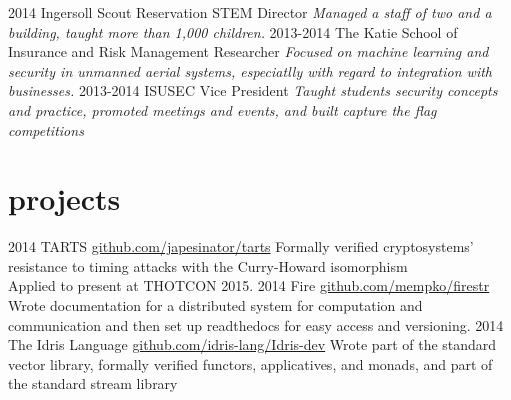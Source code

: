 \documentclass[]{friggeri-cv}
\begin{document}
\begin{entrylist}
  \entry
    {2014}
    {Ingersoll Scout Reservation}
    {STEM Director}
    {\emph{Managed a staff of two and a building, taught more than 1,000 children.}}
  \entry
    {2013-2014}
    {The Katie School of Insurance and Risk Management}
    {Researcher}
    {\emph{Focused on machine learning and security in unmanned aerial systems, especiatlly with regard to integration with businesses.}}
  \entry
    {2013-2014}
    {ISUSEC}
    {Vice President}
    {\emph{Taught students security concepts and practice, promoted meetings and events, and built capture the flag competitions}}
\end{entrylist}

\section{projects}

\begin{entrylist}
  \entry
    {2014}
    {TARTS}
    {\href{https://github.com/japesinator/tarts}{github.com/japesinator/tarts}}
    {Formally verified cryptosystems' resistance to timing attacks with the Curry-Howard isomorphism \\
    Applied to present at THOTCON 2015.}
  \entry
    {2014}
    {Fire\star}
    {\href{https://github.com/mempko/firestr}{github.com/mempko/firestr}}
    {Wrote documentation for a distributed system for computation and communication and then set up readthedocs for easy access and versioning.}
  \entry
    {2014}
    {The Idris Language}
    {\href{https://github.com/idris-lang/Idris-dev}{github.com/idris-lang/Idris-dev}}
    {Wrote part of the standard vector library, formally verified functors, applicatives, and monads, and part of the standard stream library}
\end{entrylist}
\end{document}

